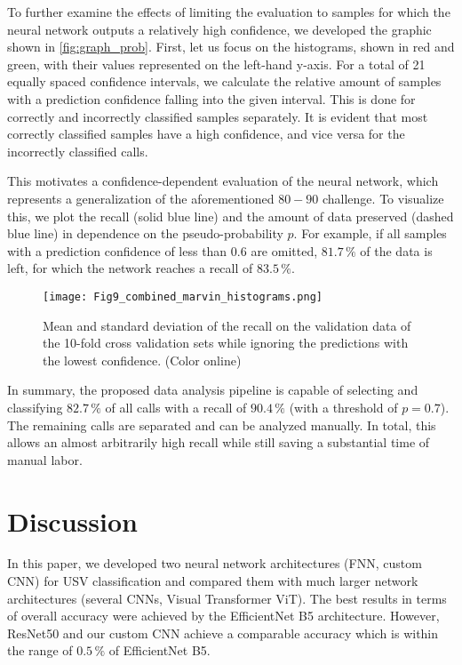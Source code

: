 \documentclass[preprint,NumberedRefs]{JASA}
\begin{document}
To further examine the effects of limiting the evaluation to samples for which the neural network outputs a relatively high confidence, we developed the graphic shown in \autoref{fig:graph_prob}. First, let us focus on the histograms, shown in red and green, with their values represented on the left-hand y-axis. For a total of 21 equally spaced confidence intervals, we calculate the relative amount of samples with a prediction confidence falling into the given interval. This is done for correctly and incorrectly classified samples separately. It is evident that most correctly classified samples have a high confidence, and vice versa for the incorrectly classified calls.

This motivates a confidence-dependent evaluation of the neural network, which represents a generalization of the aforementioned \(80-90\) challenge. To visualize this, we plot the recall (solid blue line) and the amount of data preserved (dashed blue line) in dependence on the pseudo-probability \(p\). For example, if all samples with a prediction confidence of less than \(0.6\) are omitted, \(81.7\,\mathrm{\%}\) of the data is left, for which the network reaches a recall of \(83.5\,\mathrm{\%}\).

\begin{figure}[ht]
    \texttt{[image: Fig9\_combined\_marvin\_histograms.png]}
    \caption{\label{fig:graph_prob}{Mean and standard deviation of the recall on the validation data of the 10-fold cross validation sets while ignoring the predictions with the lowest confidence. (Color online)}}
\end{figure}

In summary, the proposed data analysis pipeline is capable of selecting and classifying \(82.7\,\mathrm{\%} \) of all calls with a recall of \(90.4\,\mathrm{\%} \) (with a threshold of $p=0.7$). The remaining calls are separated and can be analyzed manually. In total, this allows an almost arbitrarily high recall while still saving a substantial time of manual labor.

\section{Discussion}
\label{sec:Discussion}

In this paper, we developed two neural network architectures (FNN, custom CNN) for USV classification and compared them with much larger network architectures (several CNNs, Visual Transformer ViT).  The best results in terms of overall accuracy were achieved by the EfficientNet B5 architecture. However, ResNet50 and our custom CNN achieve a comparable accuracy which is within the range of \(0.5\,\mathrm{\%} \) of EfficientNet B5.
\end{document}
